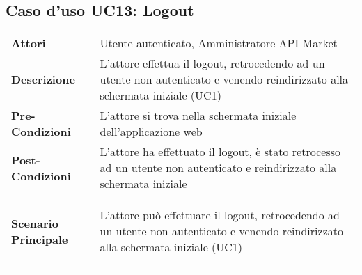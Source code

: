 \newpage
\subsection{Caso d'uso UC13: Logout}
\label{UC13}

\begin{longtable}{ l | p{11cm}}
	\hline
	\rowcolor{Gray}
	\multicolumn{2}{c}{UC13 - Logout} \\
	\hline
	\textbf{Attori} & Utente autenticato, Amministratore API Market \\
	\textbf{Descrizione} & L'attore effettua il logout, retrocedendo ad un utente non autenticato e venendo reindirizzato alla schermata iniziale (UC1) \\
	\textbf{Pre-Condizioni} & L'attore si trova nella schermata iniziale dell'applicazione web \\
	\textbf{Post-Condizioni}& L'attore ha effettuato il logout, è stato retrocesso ad un utente non autenticato e reindirizzato alla schermata iniziale \\
	\textbf{Scenario Principale} & \begin{enumerate*}[label=(\arabic*.),itemjoin={\newline}]
		\item L'attore può effettuare il logout, retrocedendo ad un utente non autenticato e venendo reindirizzato alla schermata iniziale (UC1)
	\end{enumerate*}\\
\end{longtable}
